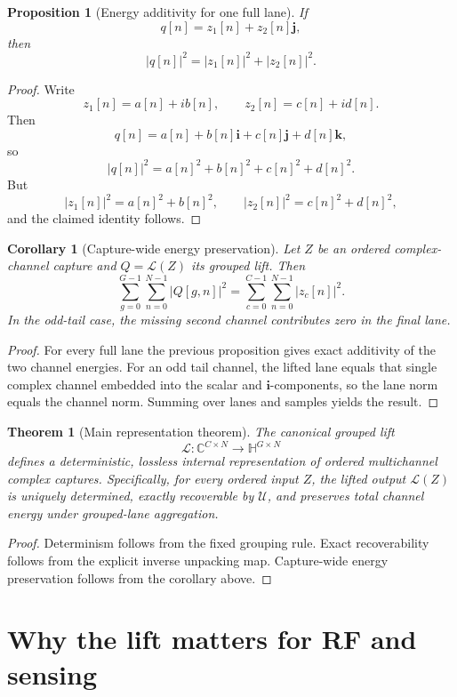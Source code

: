 \documentclass[11pt]{article}
\newtheorem{proposition}[definition]{Proposition}
\newtheorem{theorem}[definition]{Theorem}
\newtheorem{corollary}[definition]{Corollary}
\theoremstyle{remark}
\newcommand{\C}{\mathbb{C}}
\newcommand{\HH}{\mathbb{H}}
\newcommand{\ii}{\mathbf{i}}
\newcommand{\jj}{\mathbf{j}}
\newcommand{\kk}{\mathbf{k}}
\newcommand{\lift}{\mathcal{L}}
\newcommand{\unpack}{\mathcal{U}}
\newcommand{\abs}[1]{\left\lvert #1 \right\rvert}
\begin{document}
\begin{proposition}[Energy additivity for one full lane]
If
\[
q[n]=z_1[n]+z_2[n]\jj,
\]
then
\[
\abs{q[n]}^2=\abs{z_1[n]}^2+\abs{z_2[n]}^2.
\]
\end{proposition}

\begin{proof}
Write
\[
z_1[n]=a[n]+ib[n],
\qquad
z_2[n]=c[n]+id[n].
\]
Then
\[
q[n]=a[n]+b[n]\ii+c[n]\jj+d[n]\kk,
\]
so
\[
\abs{q[n]}^2=a[n]^2+b[n]^2+c[n]^2+d[n]^2.
\]
But
\[
\abs{z_1[n]}^2=a[n]^2+b[n]^2,
\qquad
\abs{z_2[n]}^2=c[n]^2+d[n]^2,
\]
and the claimed identity follows.
\end{proof}

\begin{corollary}[Capture-wide energy preservation]
Let \(Z\) be an ordered complex-channel capture and \(Q=\lift(Z)\) its grouped lift. Then
\[
\sum_{g=0}^{G-1}\sum_{n=0}^{N-1}\abs{Q[g,n]}^2
=
\sum_{c=0}^{C-1}\sum_{n=0}^{N-1}\abs{z_c[n]}^2.
\]
In the odd-tail case, the missing second channel contributes zero in the final lane.
\end{corollary}

\begin{proof}
For every full lane the previous proposition gives exact additivity of the two channel energies. For an odd tail channel, the lifted lane equals that single complex channel embedded into the scalar and \(\ii\)-components, so the lane norm equals the channel norm. Summing over lanes and samples yields the result.
\end{proof}

\begin{theorem}[Main representation theorem]
The canonical grouped lift
\[
\lift:\C^{C\times N}\to\HH^{G\times N}
\]
defines a deterministic, lossless internal representation of ordered multichannel complex captures. Specifically, for every ordered input \(Z\), the lifted output \(\lift(Z)\) is uniquely determined, exactly recoverable by \(\unpack\), and preserves total channel energy under grouped-lane aggregation.
\end{theorem}

\begin{proof}
Determinism follows from the fixed grouping rule. Exact recoverability follows from the explicit inverse unpacking map. Capture-wide energy preservation follows from the corollary above.
\end{proof}

\section{Why the lift matters for RF and sensing}
\end{document}
